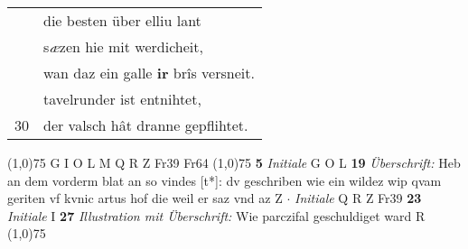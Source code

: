 \documentclass[8pt,a4paper,notitlepage]{article}
\begin{document}
\begin{table}[ht]
\begin{minipage}[t]{0.5\linewidth}
\begin{tabular}{rl}
 & die besten über elliu lant\\ 
 & s\textit{æ}zen hie mit werdicheit,\\ 
 & wan daz ein galle \textbf{ir} brîs versneit.\\ 
 & tavelrunder ist entnihtet,\\ 
30 & der valsch hât dranne gepflihtet.\\ 
\end{tabular}
\scriptsize
\line(1,0){75} \newline
G I O L M Q R Z Fr39 Fr64 \newline
\line(1,0){75} \newline
\textbf{5} \textit{Initiale} G O L  \textbf{19} \textit{Überschrift:} Heb an dem vorderm blat an so vindes [t*]: dv geschriben wie ein wildez wip qvam geriten vf kvnic artus hof die weil er saz vnd az Z   $\cdot$ \textit{Initiale} Q R Z Fr39  \textbf{23} \textit{Initiale} I  \textbf{27} \textit{Illustration mit Überschrift:} Wie parczifal geschuldiget ward R  \newline
\line(1,0){75} \newline

\end{minipage}
\end{table}
\end{document}
